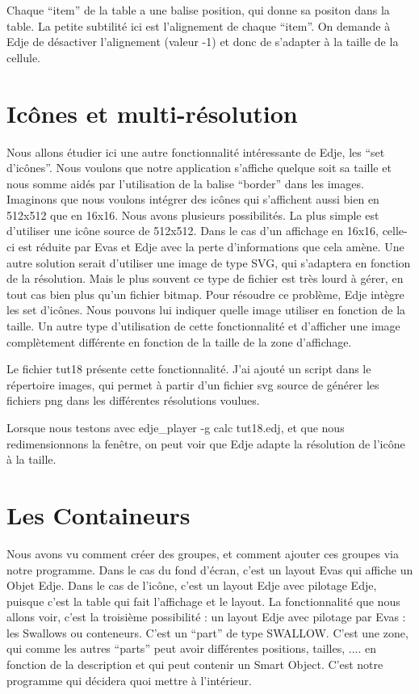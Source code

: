 \documentclass[a4paper]{efr}
\begin{document}
Chaque ``item'' de la table a une balise position, qui donne sa positon dans la
table. La petite subtilité ici est l'alignement de chaque ``item''. On demande
à Edje de désactiver l'alignement (valeur -1) et donc de s'adapter à la taille
de la cellule.

\section{Icônes et multi-résolution}

Nous allons étudier ici une autre fonctionnalité intéressante de Edje, les ``set
d'icônes''. Nous voulons que notre application s'affiche quelque soit sa taille
et nous somme aidés par l'utilisation de la balise ``border'' dans les images.
Imaginons que nous voulons intégrer des icônes qui s'affichent aussi bien en
512x512 que en 16x16. Nous avons plusieurs possibilités.
La plus simple est d'utiliser une icône source de 512x512. Dans le cas d'un
affichage en 16x16, celle-ci est réduite par Evas et Edje avec la perte
d'informations que cela amène. Une autre solution serait d'utiliser une image
de type SVG, qui s'adaptera en fonction de la résolution. Mais le plus souvent
ce type de fichier est très lourd à gérer, en tout cas bien plus qu'un fichier
bitmap.
Pour résoudre ce problème, Edje intègre les set d'icônes. Nous pouvons lui
indiquer quelle image utiliser en fonction de la taille. Un autre type
d'utilisation de cette fonctionnalité et d'afficher une image complètement
différente en fonction de la taille de la zone d'affichage.

Le fichier tut18 présente cette fonctionnalité. J'ai ajouté un script dans le
répertoire images, qui permet à partir d'un fichier svg source de générer les
fichiers png dans les différentes résolutions voulues.

Lorsque nous testons avec edje\_player -g calc tut18.edj, et que nous
redimensionnons la fenêtre, on peut voir que Edje adapte la résolution de
l'icône à la taille.

\section{Les Containeurs}

Nous avons vu comment créer des groupes, et comment ajouter ces groupes via
notre programme.
Dans le cas du fond d'écran, c'est un layout Evas qui affiche un Objet Edje.
Dans le cas de l'icône, c'est un layout Edje avec pilotage Edje, puisque c'est
la table qui fait l'affichage et le layout.
La fonctionnalité que nous allons voir, c'est la troisième possibilité :
un layout Edje avec pilotage par Evas : les Swallows ou conteneurs.
C'est un ``part'' de type SWALLOW. C'est une zone, qui comme les autres ``parts'' peut
avoir différentes positions, tailles, .... en fonction de la description et qui
peut contenir un Smart Object. C'est notre programme qui décidera quoi mettre
à l'intérieur.
\end{document}
